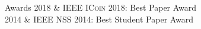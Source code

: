 %
%
%

\begin{rubriquetableau}[\offsetintab]{Awards}
  2018  & \textsc{IEEE ICoin 2018}: Best Paper Award       \hfill{}\\
  2014  & \textsc{IEEE NSS 2014}: Best Student Paper Award \hfill{}\\
\end{rubriquetableau}

%
